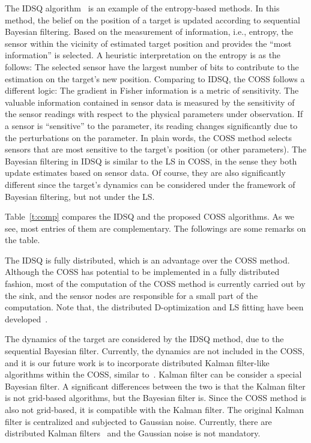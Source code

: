 The IDSQ algorithm~\cite{liu02collaborative} is an example of the entropy-based methods. In this method, the belief on the position of a target is updated according to sequential Bayesian filtering. Based on the measurement of information, i.e., entropy, the sensor within the vicinity of estimated target position and provides the ``most information'' is selected. A heuristic interpretation on the entropy is as the follows: The selected sensor have the largest number of bits to contribute to the estimation on the target's new position. Comparing to IDSQ, the COSS follows a different logic: The gradient in Fisher information is a metric of sensitivity. The valuable information contained in sensor data is measured by the sensitivity of the sensor readings with respect to the physical parameters under observation. If a sensor is ``sensitive'' to the parameter, its reading changes significantly due to the perturbations on the parameter. In plain words, the COSS method selects sensors that are most sensitive to the target's position (or other parameters). The Bayesian filtering in IDSQ is similar to the LS in COSS, in the sense they both update estimates based on sensor data. Of course, they are also significantly different since the target's dynamics can be considered under the framework of Bayesian filtering, but not under the LS.


Table~\ref{t:comp} compares the IDSQ and the proposed COSS algorithms. As we see, most entries of them are complementary. The followings are some remarks on the table.

The IDSQ is fully distributed, which is an advantage over the COSS method. Although the
COSS has potential to be implemented in a fully distributed fashion, most of the
computation of the COSS method is currently carried out by the sink, and the sensor nodes are responsible for a small part of the computation.
Note that, the distributed D-optimization and LS fitting have been developed~\cite{MurrayDecActiveSensing,XiaoBoydLallp2p_ls}.

The dynamics of the target are considered by the IDSQ method, due to the sequential Bayesian filter. Currently, the dynamics are not included in the COSS, and it is our future work is to incorporate distributed Kalman filter-like algorithms within the COSS, similar to~\cite{ChhetriSchedulingTrackingPhD2006,SabermobileDKF_cdc06}.
    Kalman filter can be consider a special Bayesian filter. A significant differences between the two is that the Kalman filter is not grid-based algorithms, but the Bayesian filter is. Since the COSS method is also not grid-based, it is compatible with the Kalman filter. The original Kalman filter is centralized and subjected to Gaussian noise. Currently, there are distributed Kalman filters~\cite{SabermobileDKF_cdc06} and the Gaussian noise is not mandatory.


